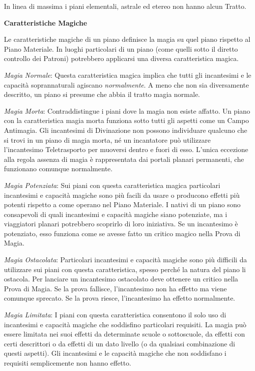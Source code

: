 \documentclass[a4paper,twoside,openany]{book}
\begin{document}
\begin{multicols}{2}
In linea di massima i piani elementali, astrale ed etereo non hanno alcun Tratto.

\medskip

\textbf{Caratteristiche Magiche}

\medskip

Le caratteristiche magiche di un piano definisce la magia su quel piano rispetto al Piano Materiale. In luoghi particolari di un piano (come quelli sotto il diretto controllo dei Patroni) potrebbero applicarsi una diversa caratteristica magica.

\emph{Magia Normale}: Questa caratteristica magica implica che tutti gli incantesimi e le capacità soprannaturali agiscano \emph{normalmente}. A meno che non sia diversamente descritto, un piano si presume che abbia il tratto magia normale.

\medskip

\emph{Magia Morta}: Contraddistingue i piani dove la magia non esiste affatto. Un piano con la caratteristica magia morta funziona sotto tutti gli aspetti come un Campo Antimagia. Gli incantesimi di Divinazione non possono individuare qualcuno che si trovi in un piano di magia morta, né un incantatore può utilizzare l'incantesimo Teletrasporto per muoversi dentro e fuori di esso. L'unica eccezione alla regola assenza di magia è rappresentata dai portali planari permanenti, che funzionano comunque normalmente.

\medskip

\emph{Magia Potenziata}: Sui piani con questa caratteristica magica particolari incantesimi e capacità magiche sono più facili da usare o producono effetti più potenti rispetto a come operano nel Piano Materiale. I nativi di un piano sono consapevoli di quali incantesimi e capacità magiche siano potenziate, ma i viaggiatori planari potrebbero scoprirlo di loro iniziativa. Se un incantesimo è potenziato, esso funziona come se avesse fatto un critico magico nella Prova di Magia.

\medskip

\emph{Magia Ostacolata}: Particolari incantesimi e capacità magiche sono più difficili da utilizzare sui piani con questa caratteristica, spesso perché la natura del piano li ostacola. Per lanciare un incantesimo ostacolato deve ottenere un critico nella Prova di Magia. Se la prova fallisce, l'incantesimo non ha effetto ma viene comunque sprecato. Se la prova riesce, l'incantesimo ha effetto normalmente.

\medskip

\emph{Magia Limitata}: I piani con questa caratteristica consentono il solo uso di incantesimi e capacità magiche che soddisfino particolari requisiti. La magia può essere limitata nei suoi effetti da determinate scuole o sottoscuole, da effetti con certi descrittori o da effetti di un dato livello (o da qualsiasi combinazione di questi aspetti). Gli incantesimi e le capacità magiche che non soddisfano i requisiti semplicemente non hanno effetto.


\end{multicols}
\end{document}
